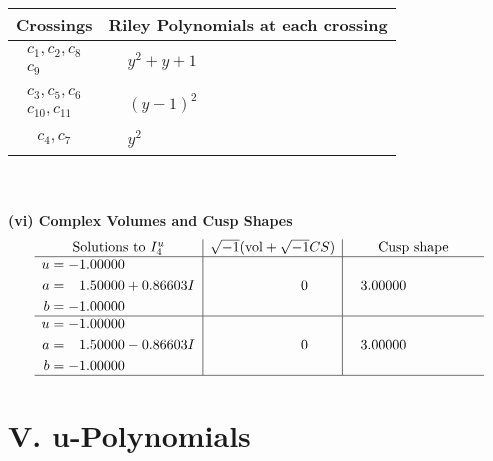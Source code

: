 \documentclass[1p]{elsarticle_modified}
\theoremstyle{definition}
\newcommand{\I}{\sqrt{-1}}
\begin{document}
\begin{tabular}{m{50pt}|m{274pt}}
Crossings & \hspace{64pt}Riley Polynomials at each crossing \\
\hline $$\begin{aligned}c_{1},c_{2},c_{8}\\c_{9}\end{aligned}$$&$\begin{aligned}
&y^2+y+1
\end{aligned}$\\
\hline $$\begin{aligned}c_{3},c_{5},c_{6}\\c_{10},c_{11}\end{aligned}$$&$\begin{aligned}
&(y-1)^2
\end{aligned}$\\
\hline $$\begin{aligned}c_{4},c_{7}\end{aligned}$$&$\begin{aligned}
&y^2
\end{aligned}$\\
\hline
\end{tabular}\\~\\
\newpage\flushleft \textbf{(vi) Complex Volumes and Cusp Shapes}
$$\begin{array}{c|c|c}  
\text{Solutions to }I^u_{4}& \I (\text{vol} + \sqrt{-1}CS) & \text{Cusp shape}\\
 \hline 
\begin{aligned}
u &= -1.00000\phantom{ +0.000000I} \\
a &= \phantom{-}1.50000 + 0.86603 I \\
b &= -1.00000\phantom{ +0.000000I}\end{aligned}
 & \phantom{-0.000000 } 0 & \phantom{-}3.00000\phantom{ +0.000000I} \\ \hline\begin{aligned}
u &= -1.00000\phantom{ +0.000000I} \\
a &= \phantom{-}1.50000 - 0.86603 I \\
b &= -1.00000\phantom{ +0.000000I}\end{aligned}
 & \phantom{-0.000000 } 0 & \phantom{-}3.00000\phantom{ +0.000000I}\\
 \hline 
 \end{array}$$\newpage
\newpage\renewcommand{\arraystretch}{1}
\centering \section*{ V. u-Polynomials}
\end{document}
